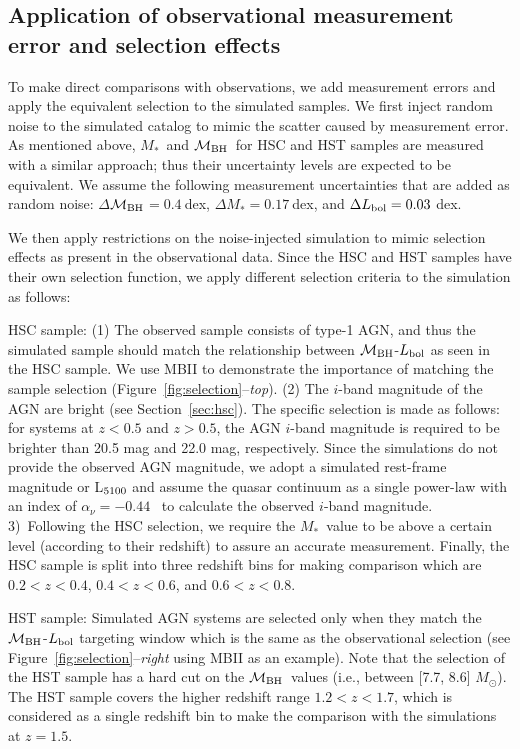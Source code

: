 \documentclass[twocolumn]{aastex631}
\def\smass{{$M_*$}}
\def\mbh{$\mathcal M_{\rm BH}$}
\begin{document}
\subsection{Application of observational measurement error and selection effects}

To make direct comparisons with observations, we add measurement errors and apply the equivalent selection to the simulated samples. We first inject random noise to the simulated catalog to mimic the scatter caused by measurement error. As mentioned above, \smass\ and \mbh\ for HSC and HST samples are measured with a similar approach; thus their uncertainty levels are expected to be equivalent. 
We assume the following measurement uncertainties that are added as random noise: $\Delta$\mbh$ = 0.4~$dex, $\Delta$\smass$ = 0.17~$dex, and $\Delta L_{\rm bol} = 0.03~$dex. 



We then apply restrictions on the noise-injected simulation to mimic selection effects as present in the observational data. Since the HSC and HST samples have their own selection function, we apply different selection criteria to the simulation as follows:

 HSC sample: (1) The observed sample consists of type-1 AGN, and thus the simulated sample should match the relationship between \mbh-$L_{\rm bol}$ as seen in the HSC sample. We use MBII to demonstrate the importance of matching the sample selection (Figure~\ref{fig:selection}--{\it top}). (2) The $i$-band magnitude of the AGN are bright (see Section~\ref{sec:hsc}). The specific selection is made as follows: for systems at $z<0.5$ and $z>0.5$, the AGN $i$-band magnitude is required to be brighter than 20.5 mag and 22.0 mag, respectively. Since the simulations do not provide the observed AGN magnitude, we adopt a simulated rest-frame magnitude or L$_{\rm 5100}$ and assume the quasar continuum as a single power-law with an index of $\alpha_\nu=-0.44$~\citep{2001AJ....122..549V} to calculate the observed $i$-band magnitude.
 3)~Following the HSC selection, we require the \smass\ value to be above a certain level (according to their redshift) to assure an accurate measurement. Finally, the HSC sample is split into three redshift bins for making comparison which are $0.2<z<0.4$, $0.4<z<0.6$, and $0.6<z<0.8$.
 
HST sample: Simulated AGN systems are selected only when they match the  \mbh-$L_{\rm bol}$ targeting window which is the same as the observational selection (see Figure~\ref{fig:selection}--{\it right} using MBII as an example). Note that the selection of the HST sample has a hard cut on the \mbh\ values (i.e., between [7.7, 8.6] $M_{\odot}$). The HST sample covers the higher redshift range $1.2<z<1.7$, which is considered as a single redshift bin to make the comparison with the simulations at $z=1.5$.
\end{document}
